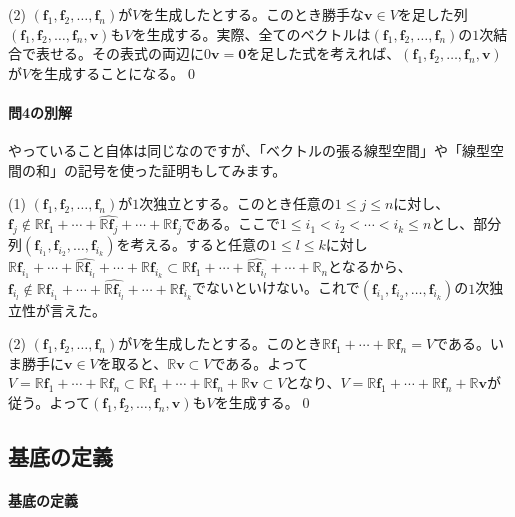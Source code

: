 \noindent (2) $(\bm{f}_1, \bm{f}_2, \ldots, \bm{f}_n)$が$V$を生成したとする。このとき勝手な$\bm{v} \in V$を足した列$(\bm{f}_1, \bm{f}_2, \ldots, \bm{f}_n, \bm{v})$も$V$を生成する。実際、全てのベクトルは$(\bm{f}_1, \bm{f}_2, \ldots, \bm{f}_n)$の$1$次結合で表せる。その表式の両辺に$0\bm{v} = \bm{0}$を足した式を考えれば、$(\bm{f}_1, \bm{f}_2, \ldots, \bm{f}_n, \bm{v})$が$V$を生成することになる。\qed

\paragraph{問4の別解} やっていること自体は同じなのですが、「ベクトルの張る線型空間」や「線型空間の和」の記号を使った証明もしてみます。

\noindent (1) $(\bm{f}_1, \bm{f}_2, \ldots, \bm{f}_n)$が$1$次独立とする。このとき任意の$1\leq j \leq n$に対し、$\bm{f}_j \not\in \mathbb{R}\bm{f}_1 + \cdots + \hat{\mathbb{R}\bm{f}_j} + \cdots + \mathbb{R}\bm{f}_j$である。ここで$1\leq i_1 < i_2 < \cdots < i_k \leq n$とし、部分列$(\bm{f}_{i_1}, \bm{f}_{i_2}, \ldots, \bm{f}_{i_k})$を考える。すると任意の$1\leq l \leq k$に対し$\mathbb{R}\bm{f}_{i_1} + \cdots + \hat{\mathbb{R}\bm{f}_{i_l}} + \cdots + \mathbb{R}\bm{f}_{i_k}\subset\mathbb{R}\bm{f}_1 + \cdots + \hat{\mathbb{R}\bm{f}_{i_l}} + \cdots + \mathbb{R}_n$となるから、$\bm{f}_{i_l} \not\in \mathbb{R}\bm{f}_{i_1} + \cdots + \hat{\mathbb{R}\bm{f}_{i_l}} + \cdots + \mathbb{R}\bm{f}_{i_k}$でないといけない。これで$(\bm{f}_{i_1}, \bm{f}_{i_2}, \ldots, \bm{f}_{i_k})$の$1$次独立性が言えた。

\noindent (2) $(\bm{f}_1, \bm{f}_2, \ldots, \bm{f}_n)$が$V$を生成したとする。このとき$\mathbb{R}\bm{f}_1 + \cdots + \mathbb{R}\bm{f}_n = V$である。いま勝手に$\bm{v} \in V$を取ると、$\mathbb{R}\bm{v} \subset V$である。よって$V = \mathbb{R}\bm{f}_1 + \cdots + \mathbb{R}\bm{f}_n \subset \mathbb{R}\bm{f}_1 + \cdots + \mathbb{R}\bm{f}_n + \mathbb{R}\bm{v} \subset V$となり、$V = \mathbb{R}\bm{f}_1 + \cdots + \mathbb{R}\bm{f}_n + \mathbb{R}\bm{v}$が従う。よって$(\bm{f}_1, \bm{f}_2, \ldots, \bm{f}_n, \bm{v})$も$V$を生成する。\qed

\subsection{基底の定義}

\paragraph{基底の定義}


